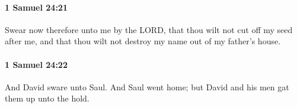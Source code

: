 		\paragraph{1 Samuel 24:21} %
			\label{1SAMUEL-24-21}

			Swear now therefore unto me by the LORD, that thou wilt not cut off my seed after me, and that thou wilt not destroy my name out of my father’s house.


		\paragraph{1 Samuel 24:22} %
			\label{1SAMUEL-24-22}

			And David sware unto Saul. And Saul went home; but David and his men gat them up unto the hold.

